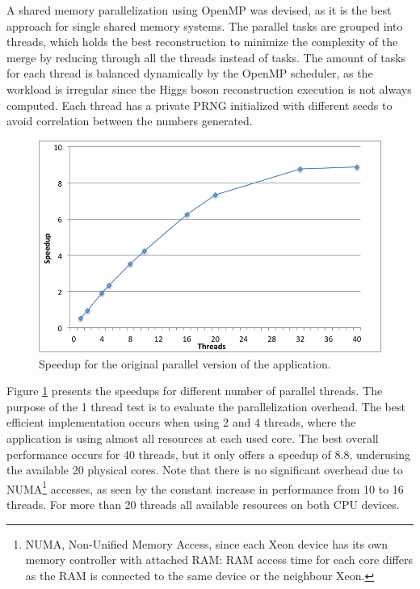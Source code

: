 A shared memory parallelization using OpenMP\cite{OpenMP} was devised, as it is the best approach for single shared memory systems. The parallel tasks are grouped into threads, which holds the best reconstruction to minimize the complexity of the merge by reducing through all the threads instead of tasks. The amount of tasks for each thread is balanced dynamically by the OpenMP scheduler, as the workload is irregular since the Higgs boson reconstruction execution is not always computed. Each thread has a private PRNG initialized with different seeds to avoid correlation between the numbers generated.

\begin{figure}[!htp]
	\begin{center}
		\includegraphics[scale=0.55]{charts/speedup_non_pointer_omp.png}
		\caption{Speedup for the \tth original parallel version of the application.}
		\label{fig:non_pointer_speedup}
	\end{center}
\end{figure}

Figure \ref{fig:non_pointer_speedup} presents the speedups for different number of parallel threads. The purpose of the 1 thread test is to evaluate the parallelization overhead. The best efficient implementation occurs when using 2 and 4 threads, where the application is using almost all resources at each used core. The best overall performance occurs for 40 threads, but it only offers a speedup of 8.8, underusing the available 20 physical cores. Note that there is no significant overhead due to NUMA\footnote{NUMA, Non-Unified Memory Access, since each Xeon device has its own memory controller with attached RAM: RAM access time for each core differs as the RAM is connected to the same device or the neighbour Xeon.} accesses, as seen by the constant increase in performance from 10 to 16 threads. For more than 20 threads all available resources on both CPU devices.

